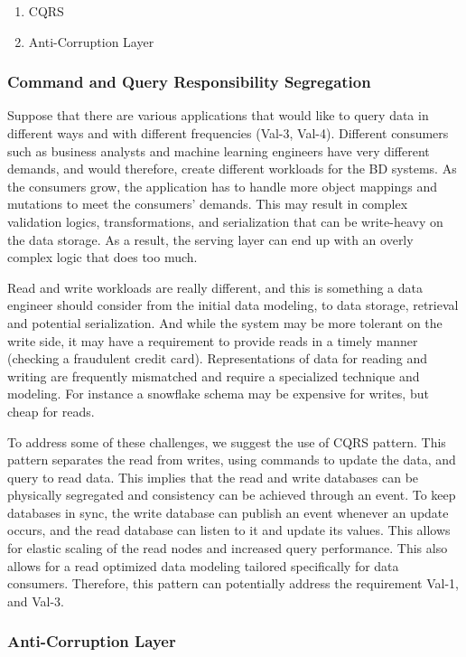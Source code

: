 \documentclass{bmcart}
\begin{document}
\begin{enumerate}
  \item  CQRS
  \item  Anti-Corruption Layer
\end{enumerate}

\subsubsection{Command and Query Responsibility Segregation}

Suppose that there are various applications that would like to query data in different ways and with different frequencies (Val-3, Val-4). Different consumers such as business analysts and machine learning engineers have very different demands, and would therefore, create different workloads for the BD systems. As the consumers grow, the application has to handle more object mappings and mutations to meet the consumers' demands. This may result in complex validation logics, transformations, and serialization that can be write-heavy on the data storage. As a result, the serving layer can end up with an overly complex logic that does too much. 

Read and write workloads are really different, and this is something a data engineer should consider from the initial data modeling, to data storage, retrieval and potential serialization. And while the system may be more tolerant on the write side, it may have a requirement to provide reads in a timely manner (checking a fraudulent credit card). Representations of data for reading and writing are frequently mismatched and require a specialized technique and modeling. For instance a snowflake schema may be expensive for writes, but cheap for reads. 

To address some of these challenges, we suggest the use of CQRS pattern. This pattern separates the read from writes, using commands to update the data, and query to read data. This implies that the read and write databases can be physically segregated and consistency can be achieved through an event. To keep databases in sync, the write database can publish an event whenever an update occurs, and the read database can listen to it and update its values. This allows for elastic scaling of the read nodes and increased query performance. This also allows for a read optimized data modeling tailored specifically for data consumers. Therefore, this pattern can potentially address the requirement Val-1, and Val-3. 

\subsubsection{Anti-Corruption Layer}
\end{document}
